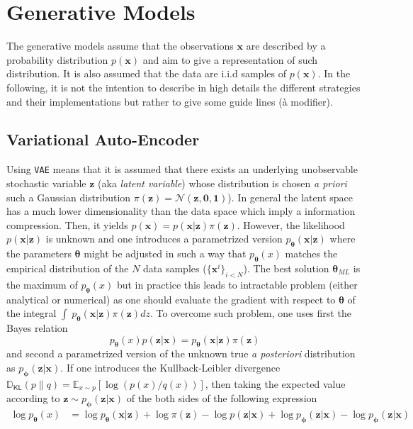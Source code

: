 \documentclass[11pt]{amsart}
\newcommand{\Esp}[0]{\ensuremath{\mathbb{E}}}
\newcommand{\DKL}[0]{\ensuremath{\mathbb{D}_{\mathsf{KL}}}}
\begin{document}
\section{Generative Models}
%
The generative models assume that the observations $\bm{x}$ are described by a probability distribution $p(\bm{x})$ and aim to give a representation of such distribution.  It is also assumed that the data are i.i.d samples of $p(\bm{x})$.  In the following, it is not the intention to describe in high details the different  strategies and their implementations but rather {\color{red} to give some guide lines (à modifier)}.
%
\subsection{Variational Auto-Encoder}
%
Using \texttt{VAE} \citep{Kingma2014} means that it is assumed that there exists an underlying unobservable stochastic variable $\bm{z}$  (aka \textit{latent variable}) whose distribution is chosen \textit{a priori}  such  a Gaussian distribution $\pi(\bm{z})=\mathcal{N}(\bm{z},\bm{0},\bm{1})$). In general the latent space has a much lower dimensionality than the data space which imply a information compression. Then, it yields $p(\bm{x}) = p(\bm{x}|\bm{z})\pi(\bm{z})$. However, the likelihood  $p(\bm{x}|\bm{z})$ is unknown and one introduces a parametrized version $p_{\bm{\theta}}(\bm{x}|\bm{z})$ where the parameters $\bm{\theta}$ might be adjusted in such a way that  $p_{\bm{\theta}}(x)$ matches the empirical distribution of the $N$ data samples ($\{\bm{x}^{i}\}_{i<N}$). The best solution $\bm{\theta}_{ML}$ is the maximum of $p_{\bm{\theta}}(x)$ but in practice this leads to  intractable problem (either analytical or numerical) as one should evaluate the gradient with respect to $\bm{\theta}$ of the integral 
$\int\ p_{\bm{\theta}}(\bm{x}|\bm{z})\pi(\bm{z}) dz$. To overcome such problem, one uses first the Bayes relation
\begin{equation}
p_{\bm{\theta}}(x) p(\bm{z}|\bm{x}) = p_{\bm{\theta}}(\bm{x}|\bm{z}) \pi(\bm{z})
\end{equation}
and second a parametrized version of the unknown true \textit{a posteriori} distribution as $p_{\bm{\phi}}(\bm{z}|\bm{x})$. If one introduces the Kullback-Leibler divergence $\DKL(p\| q)=\Esp_{x\sim p}[\log(p(x)/q(x))]$, then taking the expected value according to $\bm{z}\sim p_{\bm{\phi}}(\bm{z}|\bm{x})$ of the both sides of the following expression
\begin{align}
\log p_{\bm{\theta}}(x) &= \log p_{\bm{\theta}}(\bm{x}|\bm{z}) + \log \pi(\bm{z}) - \log p(\bm{z}|\bm{x}) + \log p_{\bm{\phi}}(\bm{z}|\bm{x}) - \log p_{\bm{\phi}}(\bm{z}|\bm{x})
\end{align}
\end{document}
